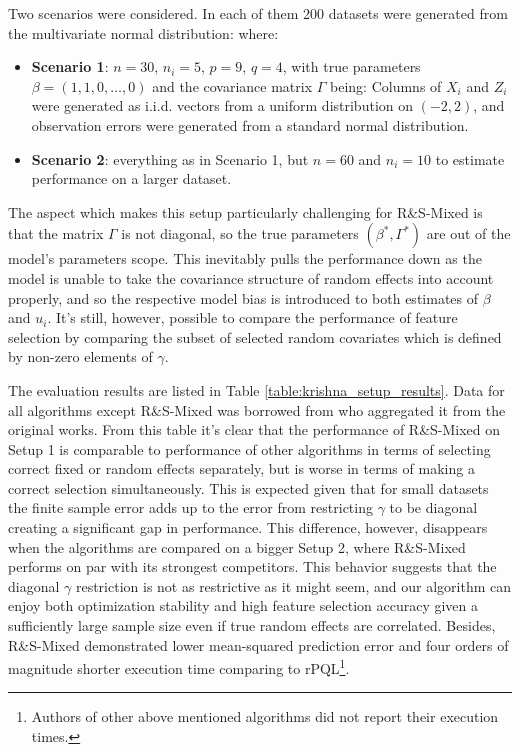 \documentclass[11pt,letterpaper]{article}
\newcommand{\ouralgo}{R\&S-Mixed }
\numberwithin{equation}{section} %
\numberwithin{figure}{section} %
\numberwithin{table}{section} %
\begin{document}
Two scenarios were considered. In each of them 200 datasets were generated from the multivariate normal distribution: 
where:
\begin{itemize}
	\item \textbf{Scenario 1}: $n=30$, $n_i=5$, $p = 9$, $q = 4$, with true parameters $\beta = (1, 1, 0, \dots, 0)$ and the covariance matrix $\Gamma$ being: 
		Columns of $X_i$ and $Z_i$ were generated as i.i.d. vectors from a uniform distribution on $(-2, 2)$, and observation errors were generated from a standard normal distribution.
	\item \textbf{Scenario 2}: everything as in Scenario 1, but $n=60$ and $n_i=10$ to estimate performance on a larger dataset. 
\end{itemize}

The aspect which makes this setup particularly challenging for \ouralgo is that the matrix $\Gamma$ is not diagonal, so the true parameters $(\beta^*, \Gamma^*)$ are out of the model's parameters scope. This inevitably pulls the performance down as the model is unable to take the covariance structure of random effects into account properly, and so the respective model bias is introduced to both estimates of $\beta$ and $u_i$. It's still, however, possible to compare the performance of feature selection by comparing the subset of selected random covariates which is defined by non-zero elements of $\gamma$.

The evaluation results are listed in Table \ref{table:krishna_setup_results}. Data for all algorithms except \ouralgo was borrowed from \cite{Hui2017} who aggregated it from the original works. From this table it's clear that the performance of \ouralgo on Setup 1 is comparable to performance of other algorithms in terms of selecting correct fixed or random effects separately, but is worse in terms of making a correct selection simultaneously. This is expected given that for small datasets the finite sample error adds up to the error from restricting $\gamma$ to be diagonal creating a significant gap in performance. This difference, however, disappears when the algorithms are compared on a bigger Setup 2, where \ouralgo performs on par with its strongest competitors. This behavior suggests that the diagonal $\gamma$ restriction is not as restrictive as it might seem, and our algorithm can enjoy both optimization stability and high feature selection accuracy given a sufficiently large sample size even if true random effects are correlated. Besides, \ouralgo demonstrated lower mean-squared prediction error and four orders of magnitude shorter execution time comparing to rPQL\footnote{Authors of other above mentioned algorithms did not report their execution times.}.
\end{document}
